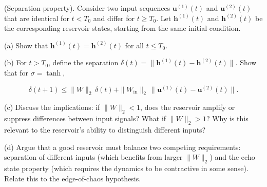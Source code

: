 \begin{exercise}
(Separation property). Consider two input sequences $\mathbf{u}^{(1)}(t)$ and $\mathbf{u}^{(2)}(t)$ that are identical for $t < T_0$ and differ for $t \geq T_0$. Let $\mathbf{h}^{(1)}(t)$ and $\mathbf{h}^{(2)}(t)$ be the corresponding reservoir states, starting from the same initial condition.

(a) Show that $\mathbf{h}^{(1)}(t) = \mathbf{h}^{(2)}(t)$ for all $t \leq T_0$.

(b) For $t > T_0$, define the separation $\delta(t) = \|\mathbf{h}^{(1)}(t) - \mathbf{h}^{(2)}(t)\|$. Show that for $\sigma = \tanh$,

\[
\delta(t+1) \leq \|W\|_2 \, \delta(t) + \|W_{\text{in}}\|_2 \, \|\mathbf{u}^{(1)}(t) - \mathbf{u}^{(2)}(t)\|.
\]

(c) Discuss the implications: if $\|W\|_2 < 1$, does the reservoir amplify or suppress differences between input signals? What if $\|W\|_2 > 1$? Why is this relevant to the reservoir's ability to distinguish different inputs?

(d) Argue that a good reservoir must balance two competing requirements: separation of different inputs (which benefits from larger $\|W\|_2$) and the echo state property (which requires the dynamics to be contractive in some sense). Relate this to the edge-of-chaos hypothesis.
\end{exercise}
